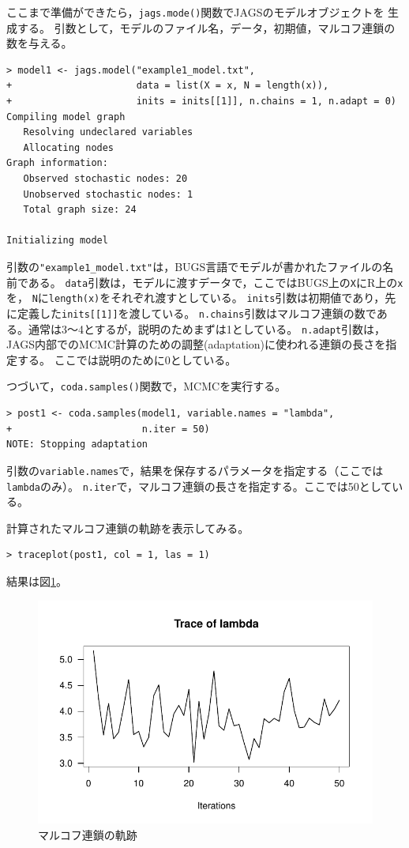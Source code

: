 \documentclass[11pt,uplatex]{jsarticle}
\begin{document}
ここまで準備ができたら，\texttt{jags.mode()}関数でJAGSのモデルオブジェクトを
生成する。
引数として，モデルのファイル名，データ，初期値，マルコフ連鎖の数を与える。
\begin{lstlisting}
> model1 <- jags.model("example1_model.txt",
+                      data = list(X = x, N = length(x)),
+                      inits = inits[[1]], n.chains = 1, n.adapt = 0)
Compiling model graph
   Resolving undeclared variables
   Allocating nodes
Graph information:
   Observed stochastic nodes: 20
   Unobserved stochastic nodes: 1
   Total graph size: 24

Initializing model

\end{lstlisting}
%
引数の\texttt{"example1\_model.txt"}は，BUGS言語でモデルが書かれたファイルの名前である。
\texttt{data}引数は，モデルに渡すデータで，ここではBUGS上の\texttt{X}に\textsf{R}上の\texttt{x}を，
\texttt{N}に\texttt{length(x)}をそれぞれ渡すとしている。
\texttt{inits}引数は初期値であり，先に定義した\texttt{inits[[1]]}を渡している。
\texttt{n.chains}引数はマルコフ連鎖の数である。通常は3〜4とするが，説明のためまずは1としている。
\texttt{n.adapt}引数は，\textsf{JAGS}内部でのMCMC計算のための調整(adaptation)に使われる連鎖の長さを指定する。
ここでは説明のために0としている。

つづいて，\texttt{coda.samples()}関数で，MCMCを実行する。
\begin{lstlisting}
> post1 <- coda.samples(model1, variable.names = "lambda",
+                       n.iter = 50)
NOTE: Stopping adaptation

\end{lstlisting}
%
引数の\texttt{variable.names}で，結果を保存するパラメータを指定する（ここでは\texttt{lambda}のみ）。
\texttt{n.iter}で，マルコフ連鎖の長さを指定する。ここでは50としている。


計算されたマルコフ連鎖の軌跡を表示してみる。
\begin{lstlisting}
> traceplot(post1, col = 1, las = 1)
\end{lstlisting}
%
結果は図\ref{fig:trace1}。

\begin{figure}[hbtp]
  \begin{center}
    \includegraphics[bb=0 0 360 240, clip, width=240 bp]{example1-1.pdf}
  \end{center}
  \caption{マルコフ連鎖の軌跡}
  \label{fig:trace1}
\end{figure}
\end{document}
